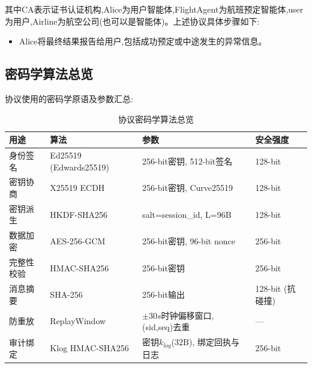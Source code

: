 其中CA表示证书认证机构,Alice为用户智能体,FlightAgent为航班预定智能体,user为用户,Airline为航空公司(也可以是智能体)。上述协议具体步骤如下:
\begin{itemize}
    
    
    
    
    
    
    
    
    \item [step8] Alice将最终结果报告给用户,包括成功预定或中途发生的异常信息。
\end{itemize}

\subsection{密码学算法总览}
协议使用的密码学原语及参数汇总:
\begin{table}[H]
\centering
\begin{tabular}{@{}llll@{}}
\toprule
\textbf{用途} & \textbf{算法} & \textbf{参数} & \textbf{安全强度} \\
\midrule
身份签名 & Ed25519 (Edwards25519) & 256-bit密钥, 512-bit签名 & 128-bit \\
密钥协商 & X25519 ECDH & 256-bit密钥, Curve25519 & 128-bit \\
密钥派生 & HKDF-SHA256 & salt=session\_id, L=96B & 128-bit \\
数据加密 & AES-256-GCM & 256-bit密钥, 96-bit nonce & 256-bit \\
完整性校验 & HMAC-SHA256 & 256-bit密钥 & 256-bit \\
消息摘要 & SHA-256 & 256-bit输出 & 128-bit (抗碰撞) \\
防重放 & ReplayWindow & $\pm30s$时钟偏移窗口, (sid,seq)去重 & — \\
审计绑定 & Klog HMAC-SHA256 & 密钥$k_{log}$(32B), 绑定回执与日志 & 256-bit \\
\bottomrule
\end{tabular}
\caption{协议密码学算法总览}
\end{table}
